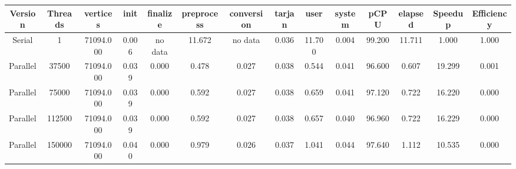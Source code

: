 \begin{tabular}{|c|c|c|c|c|c|c|c|c|c|c|c|c|c|}
\toprule
 Version &  Threads &   vertices &  init & finalize &  preprocess & conversion &  tarjan &   user &  system &   pCPU &  elapsed &  Speedup &  Efficiency \\
\midrule
  Serial &        1 &  71094.000 & 0.006 &  no data &      11.672 &    no data &   0.036 & 11.700 &   0.004 & 99.200 &   11.711 &    1.000 &       1.000 \\
Parallel &    37500 &  71094.000 & 0.039 &    0.000 &       0.478 &      0.027 &   0.038 &  0.544 &   0.041 & 96.600 &    0.607 &   19.299 &       0.001 \\
Parallel &    75000 &  71094.000 & 0.039 &    0.000 &       0.592 &      0.027 &   0.038 &  0.659 &   0.041 & 97.120 &    0.722 &   16.220 &       0.000 \\
Parallel &   112500 &  71094.000 & 0.039 &    0.000 &       0.592 &      0.027 &   0.038 &  0.657 &   0.040 & 96.960 &    0.722 &   16.229 &       0.000 \\
Parallel &   150000 &  71094.000 & 0.040 &    0.000 &       0.979 &      0.026 &   0.037 &  1.041 &   0.044 & 97.640 &    1.112 &   10.535 &       0.000 \\
\bottomrule
\end{tabular}
